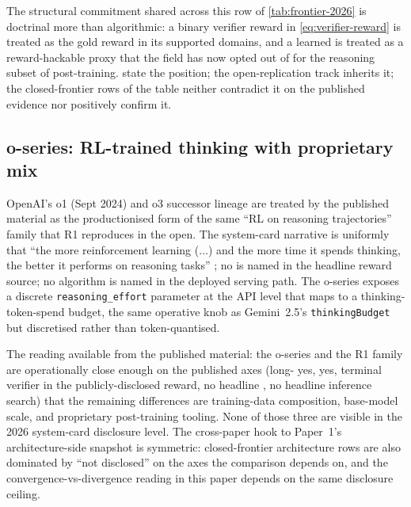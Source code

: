 The structural commitment shared across this row of
\cref{tab:frontier-2026} is doctrinal more than algorithmic: a binary
verifier reward in \cref{eq:verifier-reward} is treated as the gold
reward in its supported domains, and a learned  is treated
as a reward-hackable proxy that the field has now opted out of for the
reasoning subset of post-training. \citet[\S 2.2]{deepseek-r1} state
the position; the open-replication track inherits it; the closed-frontier
rows of the table neither contradict it on the published evidence nor
positively confirm it.

\subsection{o-series: RL-trained thinking with proprietary mix}
\label{sec:frontier-o-series}

OpenAI's o1 (Sept 2024) and o3 successor lineage  are
treated by the published material as the productionised form of the
same ``RL on reasoning trajectories'' family that R1 reproduces in the
open. The system-card narrative is uniformly that ``the more
reinforcement learning ($\ldots$) and the more time it spends thinking,
the better it performs on reasoning tasks''
; no  is named in the headline
reward source; no  algorithm is named in the
deployed serving path. The o-series exposes a discrete
\texttt{reasoning\_effort} parameter at the API level
 that maps to a
thinking-token-spend budget, the same operative knob as Gemini~2.5's
\texttt{thinkingBudget} but discretised rather than token-quantised.

The reading available from the published material: the o-series and the
R1 family are operationally close enough on the published axes
(long- yes,  yes, terminal verifier in the publicly-disclosed
reward, no headline , no headline inference search) that the
remaining differences are training-data composition, base-model scale,
and proprietary post-training tooling. None of those three are visible
in the 2026 system-card disclosure level. The cross-paper hook to
Paper~1's architecture-side snapshot is symmetric: closed-frontier
architecture rows are also dominated by ``not disclosed'' on the
axes the comparison depends on, and the convergence-vs-divergence reading in this
paper depends on the same disclosure ceiling.


